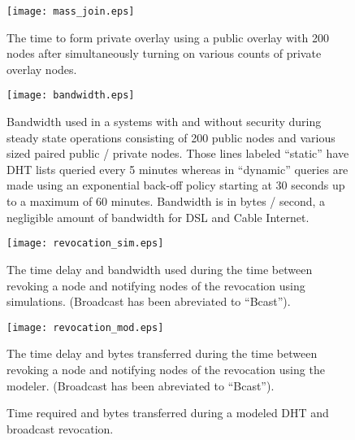 \begin{figure}[ht]
\centering
\texttt{[image: mass\_join.eps]}
\caption[Large simultaneous private pool joins.]{The time to form private
overlay using a public overlay with 200 nodes after simultaneously turning on
various counts of private overlay nodes.}
\label{fig:big_join}
\end{figure}

\begin{figure}[ht]
\centering
\texttt{[image: bandwidth.eps]}
\caption[Bandwidth comparison of insecure and secure overlays.]{Bandwidth used
in a systems with and without security during steady state operations
consisting of 200 public nodes and various sized paired public / private nodes.
Those lines labeled ``static'' have DHT lists queried every 5 minutes whereas
in ``dynamic'' queries are made using an exponential back-off policy starting
at 30 seconds up to a maximum of 60 minutes.  Bandwidth is in bytes / second, a
negligible amount of bandwidth for DSL and Cable Internet.}
\label{fig:bandwidth}
\end{figure}

\begin{figure}[ht]
\centering
\texttt{[image: revocation\_sim.eps]}
\caption[Simulated broadcast revocation evaluation.]{The time delay and
bandwidth used during the time between revoking a node and notifying nodes of
the revocation using simulations.  (Broadcast has been abreviated to
``Bcast'').}
\label{fig:revocation_sim}
\end{figure}

\begin{figure}[ht]
\centering
\texttt{[image: revocation\_mod.eps]}
\caption[Modeled broadcast revocation evaluation.]{The time delay and bytes
transferred during the time between revoking a node and notifying nodes of the
revocation using the modeler.  (Broadcast has been abreviated to ``Bcast'').}
\caption{Time required and bytes transferred during a modeled DHT and broadcast
revocation.}
\label{fig:revocation_mod}
\end{figure}

